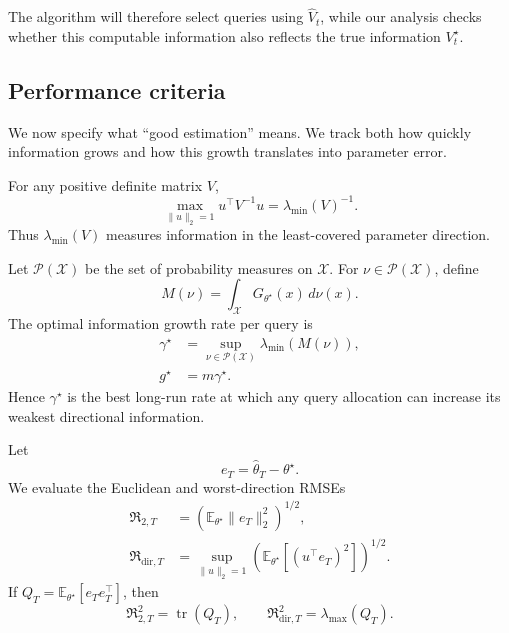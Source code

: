 \documentclass[10pt,twoside,letterpaper]{article}
\newcommand{\E}{\mathbb E}
\newcommand{\tr}{\operatorname{tr}}
\newcommand{\norm}[1]{\lVert #1\rVert}
\newcommand{\thetahat}{\widehat\theta}
\newcommand{\Vhat}{\widehat V}
\newcommand{\gstar}{g^\star}
\newcommand{\Rdir}{\mathfrak R_{\mathrm{dir},T}}
\newcommand{\Rtwo}{\mathfrak R_{2,T}}
\begin{document}
The algorithm will therefore select queries using $\Vhat_t$, while our
analysis checks whether this computable information also reflects the
true information $V_t^\star$.


\subsection{Performance criteria}

We now specify what ``good estimation'' means. We track both how quickly
information grows and how this growth translates into parameter error.

For any positive definite matrix $V$,
\begin{equation}
\max_{\norm{u}_2=1}
u^\top V^{-1}u
=
\lambda_{\min}(V)^{-1}.
\label{eq:inverse-radius}
\end{equation}
Thus $\lambda_{\min}(V)$ measures information in the least-covered
parameter direction.

Let $\mathcal P(\mathcal X)$ be the set of probability measures on
$\mathcal X$. For $\nu\in\mathcal P(\mathcal X)$, define
\begin{equation}
M(\nu)
=
\int_{\mathcal X}
G_{\theta^\star}(x)\,d\nu(x).
\end{equation}
The optimal information growth rate per query is
\begin{equation}
\begin{aligned}
\gamma^\star
&=
\sup_{\nu\in\mathcal P(\mathcal X)}
\lambda_{\min}(M(\nu)),\\
\gstar
&=
m\gamma^\star.
\end{aligned}
\label{eq:gamma-star}
\end{equation}
Hence $\gamma^\star$ is the best long-run rate at which any query
allocation can increase its weakest directional information.

Let
\begin{equation}
e_T
=
\thetahat_T-\theta^\star.
\end{equation}
We evaluate the Euclidean and worst-direction RMSEs
\begin{equation}
\begin{aligned}
\Rtwo
&=
\left(
\E_{\theta^\star}
\norm{e_T}_2^2
\right)^{1/2},\\
\Rdir
&=
\sup_{\norm{u}_2=1}
\left(
\E_{\theta^\star}
[(u^\top e_T)^2]
\right)^{1/2}.
\end{aligned}
\label{eq:risks}
\end{equation}
If
$Q_T=\E_{\theta^\star}[e_Te_T^\top]$,
then
\begin{equation}
\Rtwo^2
=
\tr(Q_T),
\qquad
\Rdir^2
=
\lambda_{\max}(Q_T).
\end{equation}
\end{document}
